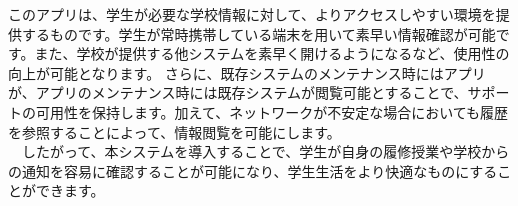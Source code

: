 このアプリは、学生が必要な学校情報に対して、よりアクセスしやすい環境を提供するものです。学生が常時携帯している端末を用いて素早い情報確認が可能です。また、学校が提供する他システムを素早く開けるようになるなど、使用性の向上が可能となります。
さらに、既存システムのメンテナンス時にはアプリが、アプリのメンテナンス時には既存システムが閲覧可能とすることで、サポートの可用性を保持します。加えて、ネットワークが不安定な場合においても履歴を参照することによって、情報閲覧を可能にします。\\
　したがって、本システムを導入することで、学生が自身の履修授業や学校からの通知を容易に確認することが可能になり、学生生活をより快適なものにすることができます。\\
